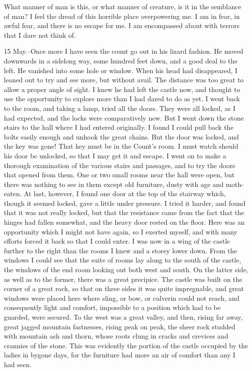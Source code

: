 What manner of man is this, or what manner of creature, is it in the semblance of man? I feel the dread of this horrible place overpowering me. I am in fear, in awful fear, and there is no escape for me. I am encompassed about with terrors that I dare not think of. 

15 May.--Once more I have seen the count go out in his lizard fashion. He moved downwards in a sidelong way, some hundred feet down, and a good deal to the left. He vanished into some hole or window. When his head had disappeared, I leaned out to try and see more, but without avail. The distance was too great to allow a proper angle of sight. I knew he had left the castle now, and thought to use the opportunity to explore more than I had dared to do as yet. I went back to the room, and taking a lamp, tried all the doors. They were all locked, as I had expected, and the locks were comparatively new. But I went down the stone stairs to the hall where I had entered originally. I found I could pull back the bolts easily enough and unhook the great chains. But the door was locked, and the key was gone! That key must be in the Count's room. I must watch should his door be unlocked, so that I may get it and escape. I went on to make a thorough examination of the various stairs and passages, and to try the doors that opened from them. One or two small rooms near the hall were open, but there was nothing to see in them except old furniture, dusty with age and moth-eaten. At last, however, I found one door at the top of the stairway which, though it seemed locked, gave a little under pressure. I tried it harder, and found that it was not really locked, but that the resistance came from the fact that the hinges had fallen somewhat, and the heavy door rested on the floor. Here was an opportunity which I might not have again, so I exerted myself, and with many efforts forced it back so that I could enter. I was now in a wing of the castle further to the right than the rooms I knew and a storey lower down. From the windows I could see that the suite of rooms lay along to the south of the castle, the windows of the end room looking out both west and south. On the latter side, as well as to the former, there was a great precipice. The castle was built on the corner of a great rock, so that on three sides it was quite impregnable, and great windows were placed here where sling, or bow, or culverin could not reach, and consequently light and comfort, impossible to a position which had to be guarded, were secured. To the west was a great valley, and then, rising far away, great jagged mountain fastnesses, rising peak on peak, the sheer rock studded with mountain ash and thorn, whose roots clung in cracks and crevices and crannies of the stone. This was evidently the portion of the castle occupied by the ladies in bygone days, for the furniture had more an air of comfort than any I had seen. 

